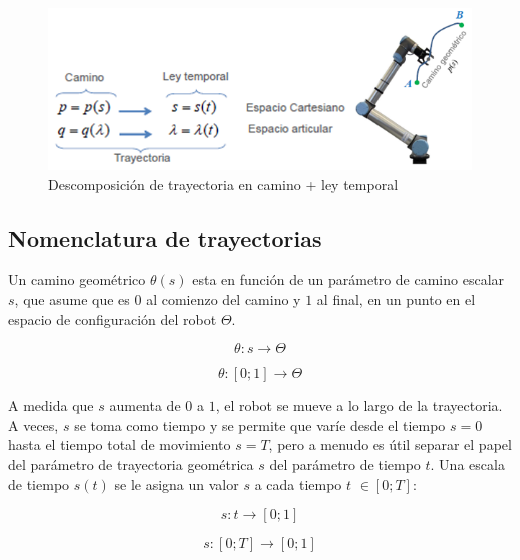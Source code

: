    
    \begin{figure}[htb]
        \centering
        \includegraphics[width=0.7\linewidth]{Main/Chapter4/Images4/cap4_tray_1.png}
        \caption{Descomposición de trayectoria en camino + ley temporal \cite{tray_utec}}
        \label{f:Cap4_tray_1}
    \end{figure}    
    
    \newpage
    
    \subsection{Nomenclatura de trayectorias}
        Un camino geométrico $\theta(s)$ esta en función de un parámetro de camino escalar $s$, que asume que es $0$ al comienzo del camino y $1$ al final, en un punto en el espacio de configuración del robot $\Theta$.
        
    \begin{equation}
        \theta: s \rightarrow   \Theta 
        \label{eq:cap4_tray_3}
    \end{equation}  
    
        \begin{equation}
        \theta: [0;1] \rightarrow   \Theta
        \label{eq:cap4_tray_4}
    \end{equation}
    
    A medida que $s$ aumenta de $0$ a $1$, el robot se mueve a lo largo de la trayectoria. A veces, $s$ se toma como tiempo y se permite que varíe desde el tiempo $s=0$ hasta el tiempo total de movimiento $s=T$, pero a menudo es útil separar el papel del parámetro de trayectoria geométrica $s$  del parámetro de tiempo $t$. Una escala de tiempo $s(t)$ se le asigna un valor $s$ a cada tiempo $t$ $ \in [0; T]$:

    \begin{equation}
        s: t \rightarrow   [0;1] 
        \label{eq:cap4_tray_5}
    \end{equation}  
    
        \begin{equation}
        s: [0; T] \rightarrow   [0;1] 
        \label{eq:cap4_tray_6}
    \end{equation}


